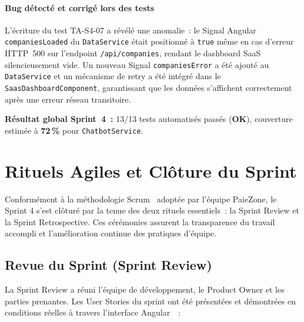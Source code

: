 \paragraph{Bug détecté et corrigé lors des tests}
L'écriture du test TA-S4-07 a révélé une anomalie~: le Signal Angular
\texttt{companiesLoaded} du \texttt{DataService} était positionné à
\texttt{true} même en cas d'erreur HTTP~500 sur l'endpoint
\texttt{/api/companies}, rendant le dashboard SaaS silencieusement vide.
Un nouveau Signal \texttt{companiesError} a été ajouté au
\texttt{DataService} et un mécanisme de retry a été intégré dans le
\texttt{SaasDashboardComponent}, garantissant que les données s'affichent
correctement après une erreur réseau transitoire.

\textbf{Résultat global Sprint~4~:} 13/13 tests automatisés passés
(\textcolor{green!60!black}{\textbf{OK}}), couverture estimée à
\textbf{72\,\%} pour \texttt{ChatbotService}.

\section{Rituels Agiles et Clôture du Sprint}
\label{sec:s4-rituels}

Conformément à la méthodologie Scrum~\cite{scrumguide} adoptée par l'équipe PaieZone,
le Sprint 4 s'est clôturé par la tenue des deux rituels essentiels~:
la Sprint Review et la Sprint Retrospective. Ces cérémonies assurent
la transparence du travail accompli et l'amélioration continue des
pratiques d'équipe.

\subsection{Revue du Sprint (Sprint Review)}

La Sprint Review a réuni l'équipe de développement, le Product Owner
et les parties prenantes. Les User Stories du sprint ont été présentées
et démontrées en conditions réelles à travers l'interface Angular~\cite{angular}~:

